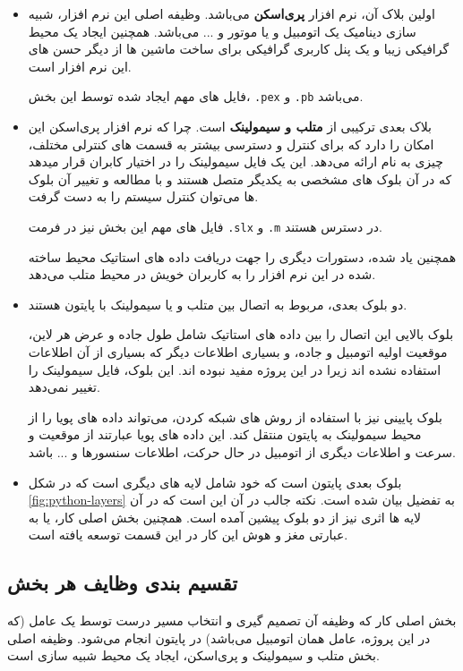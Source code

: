 \begin{itemize}
	\item 
	اولین بلاک آن، نرم افزار \textbf{پری‌اسکن }می‌باشد. وظیفه اصلی این نرم افزار، شبیه سازی دینامیک یک اتومبیل و یا موتور و ... می‌باشد. همچنین ایجاد یک محیط گرافیکی زیبا و یک پنل کاربری گرافیکی برای ساخت ماشین ها از دیگر حسن های این نرم افزار است.
	
	فایل های مهم ایجاد شده توسط این بخش، \texttt{.pex} و \texttt{.pb} می‌باشد.
	
	\item
	بلاک بعدی ترکیبی از \textbf{متلب و سیمولینک }است. چرا که نرم افزار پری‌اسکن این امکان را دارد که برای کنترل و دسترسی بیشتر به قسمت های کنترلی مختلف، چیزی به نام  ارائه می‌دهد. این  یک فایل سیمولینک را در اختیار کابران قرار میدهد که در آن بلوک های مشخصی به یکدیگر متصل هستند و با مطالعه و تغییر آن بلوک ها می‌توان کنترل سیستم را به دست گرفت.
	
	فایل های مهم این بخش نیز در فرمت \texttt{.slx} و \texttt{.m} در دسترس هستند.
	
	همچنین \api یاد شده، دستورات دیگری را جهت دریافت داده های استاتیک محیط ساخته شده در این نرم افزار را به کاربران خویش در محیط متلب می‌دهد.

	\item
	دو بلوک بعدی، مربوط به اتصال بین متلب و یا سیمولینک با پایتون هستند. 
	
	بلوک بالایی این اتصال را بین داده های استاتیک شامل طول جاده و عرض هر لاین، موقعیت اولیه اتومبیل و جاده، و بسیاری اطلاعات دیگر که بسیاری از آن اطلاعات استفاده نشده اند زیرا در این پروژه مفید نبوده اند. این بلوک، فایل سیمولینک را تغییر نمی‌دهد.
	
	بلوک پایینی نیز با استفاده از روش های شبکه کردن، می‌تواند داده های پویا را از محیط سیمولینک به پایتون منتقل کند. این داده های پویا عبارتند از موقعیت و سرعت و اطلاعات دیگری از اتومبیل در حال حرکت، اطلاعات سنسورها و ... باشد.
	
	\item 
	بلوک بعدی پایتون است که خود شامل لایه های دیگری است که در شکل 
	\ref{fig:python-layers}
	به تفضیل بیان شده است. نکته جالب در آن این است که در آن لایه ها اثری نیز از دو بلوک پیشین آمده است. همچنین بخش اصلی کار، یا به عبارتی مغز و هوش این کار در این قسمت توسعه یافته است.
\end{itemize}
\subsection{تقسیم بندی وظایف هر بخش}
بخش اصلی کار که وظیفه آن تصمیم گیری و انتخاب مسیر درست توسط یک عامل
(که در این پروژه، عامل همان اتومبیل می‌باشد) در پایتون انجام می‌شود. وظیفه اصلی بخش متلب و سیمولینک و پری‌اسکن، ایجاد یک محیط شبیه سازی است. 


